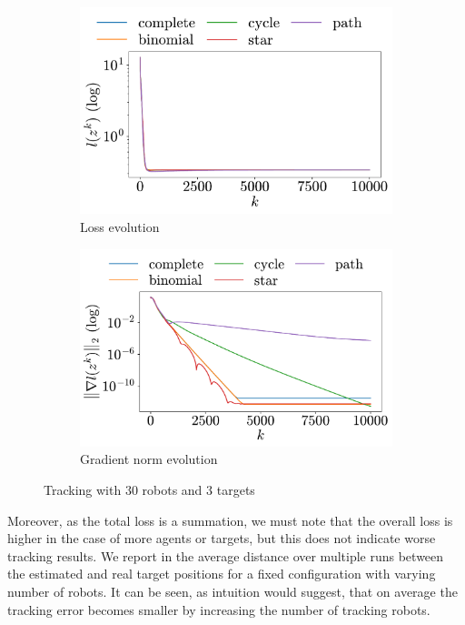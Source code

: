 \documentclass[a4paper,11pt,oneside]{book}
\begin{document}
\begin{figure}[h!]
      \centering
      \begin{subfigure}[h]{0.4\linewidth}
            \centering
            \includegraphics[width=\linewidth]{./figs/tracking/30_3_2/loss.pdf} 
            \caption{Loss evolution}
      \end{subfigure}
      \hfill
      \begin{subfigure}[h]{0.4\linewidth}
            \centering
            \includegraphics[width=\linewidth]{./figs/tracking/30_3_2/gradient.pdf} 
            \caption{Gradient norm evolution}
      \end{subfigure}
      \caption{Tracking with $30$ robots and $3$ targets}
      \label{fig:tracking_30_3}
\end{figure}


Moreover, as the total loss is a summation, we must note that the overall loss is higher in the case of more agents or targets, but this does not indicate worse tracking results. We report in  the average distance over multiple runs between the estimated and real target positions for a fixed configuration with varying number of robots. It can be seen, as intuition would suggest, that on average the tracking error becomes smaller by increasing the number of tracking robots.
\end{document}
